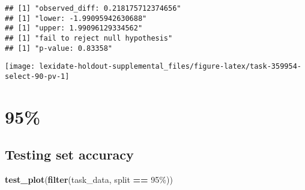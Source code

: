 \documentclass[
]{book}
\newenvironment{Shaded}{\begin{snugshade}}{\end{snugshade}}
\newcommand{\AttributeTok}[1]{\textcolor[rgb]{0.13,0.29,0.53}{#1}}
\newcommand{\DecValTok}[1]{\textcolor[rgb]{0.00,0.00,0.81}{#1}}
\newcommand{\FunctionTok}[1]{\textcolor[rgb]{0.13,0.29,0.53}{\textbf{#1}}}
\newcommand{\NormalTok}[1]{#1}
\newcommand{\OtherTok}[1]{\textcolor[rgb]{0.56,0.35,0.01}{#1}}
\newcommand{\SpecialCharTok}[1]{\textcolor[rgb]{0.81,0.36,0.00}{\textbf{#1}}}
\newcommand{\StringTok}[1]{\textcolor[rgb]{0.31,0.60,0.02}{#1}}
\begin{document}
\begin{Shaded}
\end{Shaded}

\begin{verbatim}
## [1] "observed_diff: 0.218175712374656"
## [1] "lower: -1.99095942630688"
## [1] "upper: 1.99096129334562"
## [1] "fail to reject null hypothesis"
## [1] "p-value: 0.83358"
\end{verbatim}

\texttt{[image: lexidate-holdout-supplemental\_files/figure-latex/task-359954-select-90-pv-1]}

\hypertarget{section-9}{%
\section{95\%}\label{section-9}}

\hypertarget{testing-set-accuracy-9}{%
\subsection{Testing set accuracy}\label{testing-set-accuracy-9}}

\begin{Shaded}
\begin{Highlighting}[]
\FunctionTok{test\_plot}\NormalTok{(}\FunctionTok{filter}\NormalTok{(task\_data, split }\SpecialCharTok{==} \StringTok{\textquotesingle{}95\%\textquotesingle{}}\NormalTok{))}
\end{Highlighting}
\end{Shaded}
\end{document}

